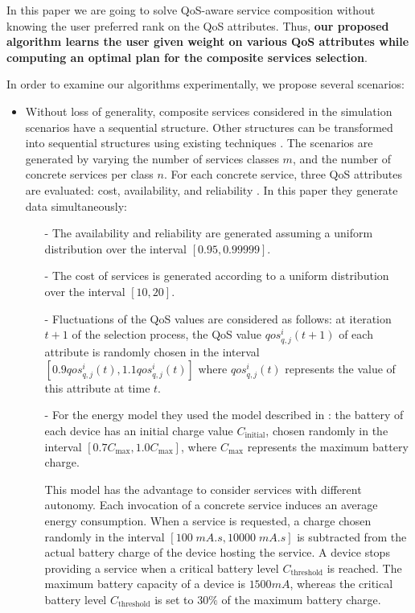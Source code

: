 \documentclass{sigchi}
\begin{document}
In this paper we are going to solve QoS-aware service composition without knowing the user preferred rank on the QoS attributes. Thus, \textbf{our proposed algorithm learns the user given weight on various QoS attributes while computing an optimal plan for the composite services selection}. {\color{blue} In order to examine our algorithms experimentally, we propose several scenarios:

\begin{itemize}
\item Without loss of generality, composite services considered in the simulation scenarios have a sequential structure. Other structures can be transformed into sequential structures using existing techniques \cite{journals/ws/CardosoSMAK04}. The scenarios are generated by varying the number of services classes  $m$, and the number of concrete services per class $n$. For each concrete service, three QoS attributes are evaluated: cost, availability, and reliability \cite{DBLP:journals/tase/KhanoucheACKY16}. In this paper they generate data simultaneously:
\begin{itemize}
\item[-] The availability and reliability are generated assuming a uniform distribution over the interval $[0.95, 0.99999]$.
\item[-] The cost of services is generated according to a uniform distribution over the interval $[10, 20]$.
\item[-] Fluctuations of the QoS values are considered as follows: at iteration $t+1$ of the selection process, the QoS value $qos_{q,j}^i (t+1)$ of each attribute is randomly chosen in the interval $[0.9 qos_{q,j}^i(t), 1.1 qos_{q,j}^i(t)]$ where $qos_{q,j}^i(t)$ represents the value of this attribute at time $t$.
\item[-]For the energy model they used the model described in \cite{Flinn:1999:EAM:319344.319155}: the battery of each device has an initial charge value $C_{\text{initial}}$, chosen randomly in the interval $[0.7 C_{\text{max}}, 1.0 C_{\text{max}}]$, where $C_{\text{max}}$ represents the maximum battery charge. 

This model has the advantage to consider services with different autonomy. Each invocation of a concrete service induces an average energy consumption. When a service is requested, a charge chosen randomly in the interval $[100 \; mA.s, 10000 \; mA.s]$ is subtracted from the actual battery charge of the device hosting the service. A device stops providing a service when a critical battery level $C_{\text{threshold}}$ is reached. The maximum battery capacity of a device is $1500 mA$, whereas the critical battery level $C_{\text{threshold}}$ is set to $30\%$ of the maximum battery charge. 
\end{itemize}
\end{itemize}
}
\end{document}
